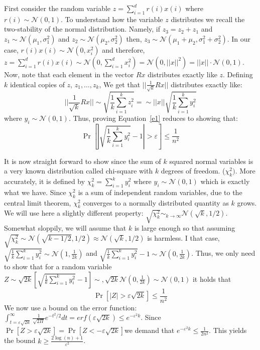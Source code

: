 \documentclass{article}
\newcommand{\eps}{\varepsilon}
\newcommand{\N}{\mathcal N}
\begin{document}
First consider the random variable $z = \sum_{i=1}^{d}r(i)x(i)$ where $r(i) \sim \N(0,1)$. 
To understand how the variable $z$ distributes we recall the two-stability of the
normal distribution. Namely, if $z_3 = z_2 + z_1$ and $z_1 \sim \N(\mu_1,\sigma^{2}_{1})$ and $z_2 \sim \N(\mu_2,\sigma^{2}_{2})$ then, $z_3 \sim \N(\mu_1 + \mu_2,\sigma^{2}_{1} + \sigma^{2}_{2})$.
In our case,  $r(i)x(i) \sim \N(0,x^{2}_{i})$ and therefore, $z = \sum_{i=1}^{d}r(i)x(i) \sim \N(0,\sum_{i=1}^{d}x^{2}_{i}) = \N(0,||x||^{2}) =  ||x||\cdot\N(0,1)$. Now, note that each element in the vector $Rx$ distributes exactly like $z$.
Defining $k$ identical copies of $z$, $z_1,\ldots,z_k$,
We get that $||\frac{1}{\sqrt{k}}Rx||$ distributes exactly like:
\[
||\frac{1}{\sqrt{k}}Rx|| \sim \sqrt{\frac{1}{k}\sum_{i=1}^{k} z^{2}_{i}} = \sim ||x||\sqrt{\frac{1}{k}\sum_{i=1}^{k} y^{2}_{i}}
\]
where $y_i \sim \N(0,1)$.
Thus, proving Equation~\ref{e1} reduces to showing that:
\begin{equation}
\Pr\left[ \left| \sqrt{\frac{1}{k}\sum_{i=1}^{k} y^{2}_{i}} - 1 \right| > \eps \right] \le \frac{1}{n^2} 
\end{equation}

It is now straight forward to show since the sum of $k$ squared normal variables is a very known distribution called chi-square with $k$ degrees of freedom. ($\chi^2_k)$.
More accurately, it is defined by $\chi^2_k = \sum_{i=1}^{k} y^{2}_{i}$ where $y_i \sim \N(0,1)$ which is exactly what we have.
Since $\chi^2_k$ is a sum of independent random variables, due to the central limit theorem, $\chi^2_k$ converges to a normally distributed quantity as $k$ grows. We will use here a slightly different property: 
$\sqrt{\chi^2_k} \sim_{k \rightarrow \infty} \N(\sqrt{k},1/2)$. Somewhat sloppily, we will assume that $k$ is large enough so that 
assuming $\sqrt{\chi^2_k} \sim \N(\sqrt{k-1/2},1/2) \approx \N(\sqrt{k},1/2)$ is harmless. I that case, $ \sqrt{\frac{1}{k}\sum_{i=1}^{k} y^{2}_{i}} \sim \N(1,\frac{1}{2k})$ and $ \sqrt{\frac{1}{k}\sum_{i=1}^{k} y^{2}_{i}} -1\sim \N(0,\frac{1}{2k})$.
Thus, we only need to show that for a random variable $Z \sim \sqrt{2k}\left[\sqrt{\frac{1}{k}\sum_{i=1}^{k} y^{2}_{i}} -1\right] \sim,\sqrt{2k}\N(0,\frac{1}{2k})  \sim \N(0,1)$ it holds that  
\begin{equation}
\Pr\left[ | Z | > \eps \sqrt{2k}\right] \le \frac{1}{n^2} 
\end{equation}
We now use a bound on the error function: $\int_{t=\eps \sqrt{2k}}^{\infty} \frac{1}{\sqrt{2\Pi}}e^{-t^2/2}dt = erf(\eps \sqrt{2k}) \le e^{-\eps^2k}$. Since $\Pr[Z  > \eps \sqrt{2k}] = \Pr[Z  < -\eps \sqrt{2k}] $we demand that $e^{-\eps^2k} \le \frac{1}{2n^2}$. This yields the bound $k \ge \frac{2\log(n)+1}{\eps^2}$.
\end{document}
